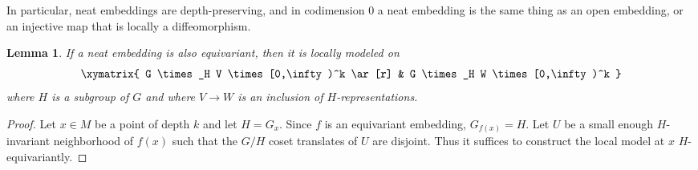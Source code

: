 \documentclass[11pt]{amsart}
\newtheorem{lem}{Lemma}[section]
\theoremstyle{definition}
\numberwithin{equation}{section}
\numberwithin{figure}{section}
\begin{document}
In particular, neat embeddings are depth-preserving, and in codimension 0 a neat embedding is the same thing as an open embedding, or an injective map that is locally a diffeomorphism.

\begin{lem}\label{local_model}
If a neat embedding is also equivariant, then it is locally modeled on
\begin{equation*}
 \xymatrix{ G \times_H V \times [0,\infty)^k \ar[r] & G \times_H W \times [0,\infty)^k } 
 \end{equation*}
where $H$ is a subgroup of $G$ and where $V\to W$ is an inclusion of $H$-representations.
\end{lem}

\begin{proof}
Let $x\in M$ be a point of depth $k$ and let $H=G_x$. Since $f$ is an equivariant embedding, $G_{f(x)}=H$. Let $U$ be a small enough $H$-invariant neighborhood of  $f(x)$ such that the $G/H$ coset translates of $U$ are disjoint. Thus it suffices to construct the local model at $x$ $H$-equivariantly.


\end{proof}
\end{document}
